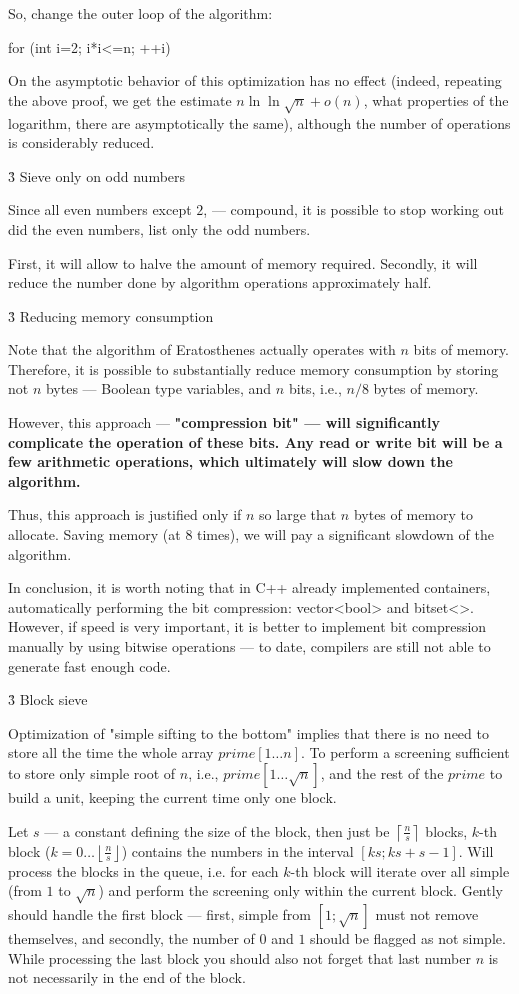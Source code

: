 So, change the outer loop of the algorithm:

\code
for (int i=2; i*i<=n; ++i)
\endcode

On the asymptotic behavior of this optimization has no effect (indeed, repeating the above proof, we get the estimate $n \ln \ln \sqrt{n} + o(n)$, what properties of the logarithm, there are asymptotically the same), although the number of operations is considerably reduced.


\h3{ Sieve only on odd numbers }

Since all even numbers except $2$, --- compound, it is possible to stop working out did the even numbers, list only the odd numbers.

First, it will allow to halve the amount of memory required. Secondly, it will reduce the number done by algorithm operations approximately half.


\h3{ Reducing memory consumption }

Note that the algorithm of Eratosthenes actually operates with $n$ bits of memory. Therefore, it is possible to substantially reduce memory consumption by storing not $n$ bytes --- Boolean type variables, and $n$ bits, i.e., $n/8$ bytes of memory.

However, this approach --- \bf{"compression bit"} --- will significantly complicate the operation of these bits. Any read or write bit will be a few arithmetic operations, which ultimately will slow down the algorithm.

Thus, this approach is justified only if $n$ so large that $n$ bytes of memory to allocate. Saving memory (at $8$ times), we will pay a significant slowdown of the algorithm.

In conclusion, it is worth noting that in C++ already implemented containers, automatically performing the bit compression: vector<bool> and bitset<>. However, if speed is very important, it is better to implement bit compression manually by using bitwise operations --- to date, compilers are still not able to generate fast enough code.


\h3{ Block sieve }

Optimization of "simple sifting to the bottom" implies that there is no need to store all the time the whole array $prime[1 \ldots n]$. To perform a screening sufficient to store only simple root of $n$, i.e., $prime[1 \ldots \sqrt{n}]$, and the rest of the $prime$ to build a unit, keeping the current time only one block.

Let $s$ --- a constant defining the size of the block, then just be $\left\lceil \frac{n}{s} \right\rceil$ blocks, $k$-th block ($k = 0 \ldots \left\lfloor \frac{n}{s} \right\rfloor$) contains the numbers in the interval $[ks; ks+s-1]$. Will process the blocks in the queue, i.e. for each $k$-th block will iterate over all simple (from $1$ to $\sqrt{n}$) and perform the screening only within the current block. Gently should handle the first block --- first, simple from $[1; \sqrt{n}]$ must not remove themselves, and secondly, the number of $0$ and $1$ should be flagged as not simple. While processing the last block you should also not forget that last number $n$ is not necessarily in the end of the block.

